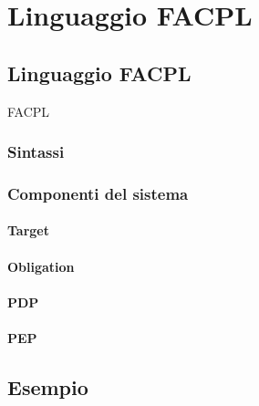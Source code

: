 \chapter{Linguaggio FACPL}
\label{chap:Linguaggio FACPL}

\section{Linguaggio FACPL}
\label{sec:Linguaggio FACPL}
FACPL
\subsection{Sintassi}
\label{sub:Sintassi}

\subsection{Componenti del sistema}
\label{sub:Componenti del sistema}
\subsubsection{Target}
\label{subs:Target}
\subsubsection{Obligation}
\label{subs:Obligation}

\subsubsection{PDP}
\label{subs:PDP}
\subsubsection{PEP}
\label{subs:PEP}

\section{Esempio}
\label{sec:Esempio}
